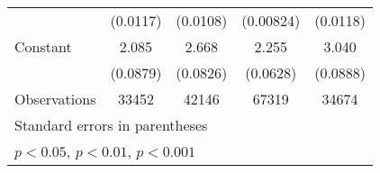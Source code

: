 {\begin{tabular*}{\textwidth}{@{\hskip\tabcolsep\extracolsep\fill}l*{4}{c}}
                    &    (0.0117)         &    (0.0108)         &   (0.00824)         &    (0.0118)         \\
\addlinespace
Constant            &       2.085\sym{***}&       2.668\sym{***}&       2.255\sym{***}&       3.040\sym{***}\\
                    &    (0.0879)         &    (0.0826)         &    (0.0628)         &    (0.0888)         \\
\midrule
Observations        &       33452         &       42146         &       67319         &       34674         \\
\bottomrule
\multicolumn{5}{l}{\footnotesize Standard errors in parentheses}\\
\multicolumn{5}{l}{\footnotesize \sym{*} \(p<0.05\), \sym{**} \(p<0.01\), \sym{***} \(p<0.001\)}\\
\end{tabular*}
}
